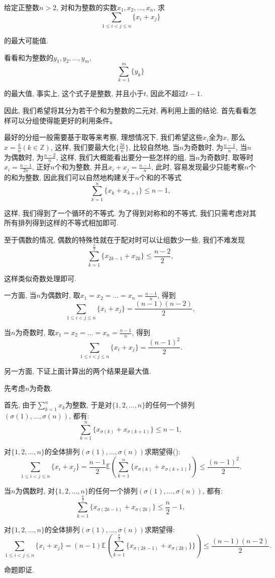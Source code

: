 \documentclass[lang=cn,12pt,thmcnt=section]{elegantbook}
\renewcommand{\note}[1]{({\kaishu\dashuline{#1}})}
\begin{document}
\begin{example}
给定正整数$n>2$, 对和为整数的实数$x_1,x_2,\dots{},x_n$, 求
\[
\sum_{1\le i<j\le n}\{x_i+x_j\}
\]

的最大可能值.
\end{example}

\begin{analysis}
看看和为整数的$y_1,y_2,\dots{},y_m$, 
\[
\sum_{k=1}^m \{y_k\}
\]

的最大值, 事实上, 这个式子是整数, 并且小于$t$, 因此不超过$t-1$.

因此, 我们希望将其分为若干个和为整数的二元对, 再利用上面的结论. 首先看看怎样可以分组使得能更好的利用条件。

最好的分组一般需要基于取等来考察, 理想情况下, 我们希望这些$x_i$全为$x$, 那么$x=\frac{k}{n}(k\in \mathbb{Z})$, 这样, 我们要最大化$\{\frac{2k}{n}\}$, 比较自然地, 当$n$为奇数时, 为$\frac{n-1}{n}$, 当$n$为偶数时, 为$\frac{n-2}{n}$, 这样, 我们大概能看出要分一些怎样的组, 当$n$为奇数时, 取等时$x_i=\frac{n-1}{2n}$, 正好$n$个和为整数, 并且$x_i+x_j=\frac{n-1}{n}$, 此时, 容易发现最少只能考察$n$个的和为整数, 因此我们可以自然地构建关于$n$个和的不等式
\[
\sum_{k=1}^n \{x_k+x_{k+1}\}\le n-1,
\]

这样, 我们得到了一个循环的不等式. 为了得到对称和的不等式, 我们只需考虑对其所有排列得到这样的不等式相加即可. 

至于偶数的情况, 偶数的特殊性就在于配对时可以让组数少一些, 我们不难发现
\[
\sum_{k=1}^{\frac{n}{2}}\{x_{2k-1}+x_{2k}\}\le \frac{n-2}{2},
\]

这样类似奇数处理即可.
\end{analysis}

\begin{solution}
一方面, 当$n$为偶数时, 取$x_1=x_2=\dots{}=x_n=\frac{n-1}{n}$, 得到
\[
\sum_{1\le i<j\le n}\{x_i+x_j\}=\frac{(n-1)(n-2)}{2},
\]

当$n$为奇数时, 取$x_1=x_2=\dots{}=x_n=\frac{n-1}{n}$, 得到
\[
\sum_{1\le i<j\le n}\{x_i+x_j\}=\frac{(n-1)^2}{2}.
\]

另一方面, 下证上面计算出的两个结果是最大值. 

先考虑$n$为奇数.

首先, 由于$\sum\limits_{k=1}^{n}x_k$为整数, 于是对$\{1,2,\dots{},n\}$的任何一个排列$(\sigma(1),\dots{},\sigma(n))$, 都有: 
\[
\sum_{k=1}^n \{x_{\sigma(k)}+x_{\sigma(k+1)}\}\le n-1,
\]

对$\{1,2,\dots{},n\}$的全体排列$(\sigma(1),\dots{},\sigma(n))$求期望得\note{因为在期望中每个$\{x_i+x_j\}$出现概率相同}: 
\[
\sum_{1\le i<j\le n}\{x_i+x_j\}=\frac{n-1}{2}\mathbb{E}\left(\sum_{k=1}^n \{x_{\sigma(k)}+x_{\sigma(k+1)}\}\right)\le \frac{(n-1)^2}{2}.
\]

当$n$为偶数时, 对$\{1,2,\dots{},n\}$的任何一个排列$(\sigma(1),\dots{},\sigma(n))$, 都有: 
\[
\sum_{k=1}^{\frac{n}{2}} \{x_{\sigma(2k-1)}+x_{\sigma(2k)}\}\le \frac{n}{2}-1,
\]

对$\{1,2,\dots{},n\}$的全体排列$(\sigma(1),\dots{},\sigma(n))$求期望得: 
\[
\sum_{1\le i<j\le n}\{x_i+x_j\}=({n-1})\mathbb{E}\left(\sum_{k=1}^{\frac{n}{2}} \{x_{\sigma(2k-1)}+x_{\sigma(2k)}\}\}\right)\le \frac{(n-1)(n-2)}{2}.
\]

命题即证.
\end{solution}
\end{document}
